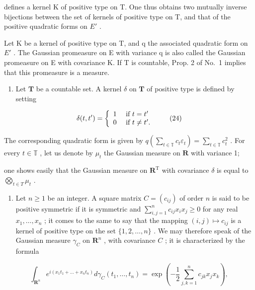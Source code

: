 defines a kernel K of positive type on T. One thus obtains two mutually inverse bijections between the set of kernels of positive type on T, and that of the positive quadratic forms on \(E'\) .

Let K be a kernel of positive type on T, and q the associated quadratic form on \(E'\) . The Gaussian promeasure on E with variance q is also called the Gaussian promeasure on E with covariance K. If T is countable, Prop. 2 of No.~1 implies that this promeasure is a measure.

\begin{enumerate}
\def\labelenumi{\arabic{enumi})}
\setcounter{enumi}{2}
\tightlist
\item
  Let \(\mathbf{T}\) be a countable set. A kernel \(\delta\) on \(\mathbf{T}\) of positive type is defined by setting
\end{enumerate}

\[
\delta (t, t ^ {\prime}) = \left\{ \begin{array}{l l} 1 & \text { if } t = t ^ {\prime} \\ 0 & \text { if } t \neq t ^ {\prime}. \end{array} \right.\tag{24}
\]

The corresponding quadratic form is given by \(q\left(\sum_{t \in \mathbb{T}} c_t \varepsilon_t\right) = \sum_{t \in \mathbb{T}} c_t^2\) . For every \(t \in \mathbb{T}\) , let us denote by \(\mu_t\) the Gaussian measure on \(\mathbf{R}\) with variance 1;

one shows easily that the Gaussian measure on \(\mathbf{R}^{\mathrm{T}}\) with covariance \(\delta\) is equal to \(\bigotimes_{t\in T}\mu_t\) .

\begin{enumerate}
\def\labelenumi{\arabic{enumi})}
\setcounter{enumi}{3}
\tightlist
\item
  Let \(n \geqslant 1\) be an integer. A square matrix \(C = (c_{ij})\) of order \(n\) is said to be positive symmetric if it is symmetric and \(\sum_{i,j=1}^{n} c_{ij} x_i x_j \geqslant 0\) for any real \(x_1, \ldots, x_n\) ; it comes to the same to say that the mapping \((i,j) \mapsto c_{ij}\) is a kernel of positive type on the set \(\{1,2,\ldots,n\}\) . We may therefore speak of the Gaussian measure \(\gamma_C\) on \(\mathbf{R}^n\) , with covariance \(C\) ; it is characterized by the formula
\end{enumerate}

\[
\int_ {\mathbf {R} ^ {n}} e ^ {i (x _ {1} t _ {1} + \dots + x _ {n} t _ {n})} d \gamma_ {C} (t _ {1}, \dots , t _ {n}) = \exp \left(- \frac {1}{2} \sum_ {j, k = 1} ^ {n} c _ {j k} x _ {j} x _ {k}\right),\tag{25}
\]

